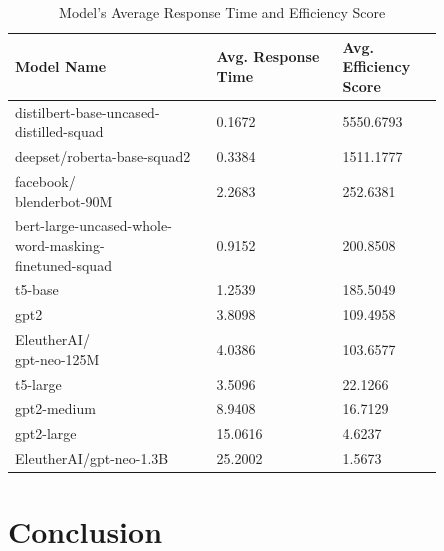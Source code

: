 \documentclass{wseas}
\begin{document}
\begin{table}[htbp]
  \centering
  \caption{Model's Average Response Time and Efficiency Score} %
  \label{tab:model_efficiency_scores}  %
  \begin{tabular}{|p{0.4\linewidth}|p{0.25\linewidth}|p{0.2\linewidth}|}
    \hline
    \textbf{Model Name} & \textbf{Avg. Response Time} & \textbf{Avg. Efficiency Score} \\
    \hline
    distilbert-base-uncased-distilled-squad & 0.1672 & 5550.6793 \\
    \hline
    deepset/roberta-base-squad2 & 0.3384 & 1511.1777 \\
    \hline
    \makecell[l]{facebook/\\blenderbot-90M}& 2.2683 & 252.6381 \\
    \hline
    \makecell[l]{bert-large-uncased-whole-word-masking-\\finetuned-squad} & 0.9152 & 200.8508 \\
    \hline
    t5-base & 1.2539 & 185.5049 \\
    \hline
    gpt2 & 3.8098 & 109.4958 \\
    \hline
    \makecell[l]{EleutherAI/\\gpt-neo-125M} & 4.0386 & 103.6577 \\
    \hline
    t5-large & 3.5096 & 22.1266 \\
    \hline
    gpt2-medium & 8.9408 & 16.7129 \\
    \hline
    gpt2-large & 15.0616 & 4.6237 \\
    \hline
    EleutherAI/gpt-neo-1.3B & 25.2002 & 1.5673 \\
    \hline
  \end{tabular}
\end{table}

\section{Conclusion}
\end{document}
